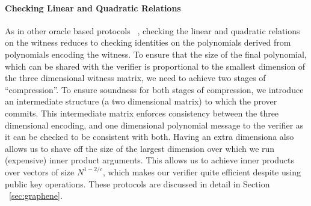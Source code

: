 \begin{comment}
<<<<<<< HEAD
\paragraph{Linear check} The protocol to check the linear relations on the witness starts as in Ligero to reduce the checks to polynomial identity testing. We then design new steps to further reduce this test to multiple inner-product arguments on vectors of lengths linear in the individual dimensions of the 3D witness matrix. An additional check is performed to test the consistency of the inputs used in the inner-products with those committed in the oracle.
\paragraph{Quadratic check} This protocol follows the same set of steps as the linear check, except that additional MPC is required to obtain the inputs for the inner product arguments during distributed proof generation. The MPC will be required for $N$ independent multiplications between the witness bits and this would incur an additional $O(N\times \Num^2)$ communication among the provers.\dnote{Check complexity in prev sentence.}  This protocol is presented in Section~\ref{sec:graphene}.
=======
\end{comment}
\paragraph{Checking Linear and Quadratic Relations} As in other oracle based protocols
~\cite{ligero,aurora}, checking the linear and quadratic relations on the witness reduces to 
 checking identities on the polynomials derived from polynomials encoding the witness. 
To ensure that the size of the final polynomial, which can be shared with the verifier is
proportional to the smallest dimension of the three dimensional witness matrix,
we need to achieve two stages of ``compression''. To ensure soundness for both
stages of compression, we introduce an intermediate structure (a two dimensional
matrix) to which the prover commits. This intermediate matrix enforces
consistency between the three dimensional encoding, and one dimensional
polynomial message to the verifier as it can be checked to be consistent with
both. Having an extra dimensiona also allows us to shave off the size of the
largest dimension over which we run (expensive) inner product arguments. This
allows us to achieve inner products over vectors of size $N^{1-2/c}$, which
makes our verifier quite efficient despite using public key operations. These
protocols are discussed in detail in Section ~\ref{sec:graphene}.

